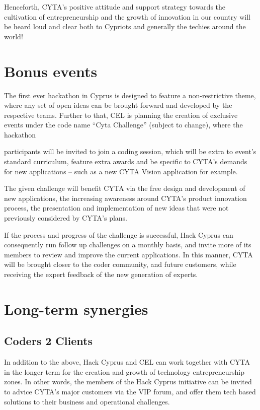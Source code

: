 \documentclass[a4paper,11pt]{report}
\begin{document}
Henceforth, CYTA’s positive attitude and support strategy towards the cultivation of entrepreneurship and the growth of innovation in our country will be heard loud and clear both to Cypriots and generally the techies around the world!

\section{Bonus events}
The first ever hackathon in Cyprus is designed to feature a non-restrictive theme, where any set of open ideas can be brought forward and developed by the respective teams. Further to that, CEL is planning the creation of exclusive events under the code name “Cyta Challenge” (subject to change), where the hackathon

participants will be invited to join a coding session, which will be extra to event’s standard curriculum, feature extra awards and be specific to CYTA’s demands for new applications – such as a new CYTA Vision application for example.

The given challenge will benefit CYTA via the free design and development of new applications, the increasing awareness around CYTA’s product innovation process, the presentation and implementation of new ideas that were not previously considered by CYTA’s plans.

If the process and progress of the challenge is successful, Hack Cyprus can consequently run follow up challenges on a monthly basis, and invite more of its members to review and improve the current applications. In this manner, CYTA will be brought closer to the coder community, and future customers, while receiving the expert feedback of the new generation of experts.

\section{Long-term synergies}
\subsection{Coders 2 Clients}
In addition to the above, Hack Cyprus and CEL can work together with CYTA in the longer term for the creation and growth of technology entrepreneurship zones. In other words, the members of the Hack Cyprus initiative can be invited to advice CYTA’s major customers via the VIP forum, and offer them tech based solutions to their business and operational challenges.
\end{document}
